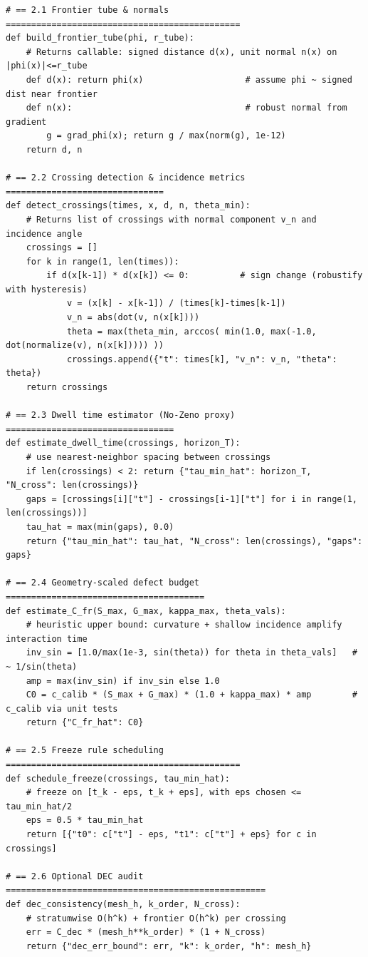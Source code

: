 \begin{lstlisting}
# == 2.1 Frontier tube & normals ==============================================
def build_frontier_tube(phi, r_tube):
    # Returns callable: signed distance d(x), unit normal n(x) on |phi(x)|<=r_tube
    def d(x): return phi(x)                    # assume phi ~ signed dist near frontier
    def n(x):                                  # robust normal from gradient
        g = grad_phi(x); return g / max(norm(g), 1e-12)
    return d, n

# == 2.2 Crossing detection & incidence metrics ===============================
def detect_crossings(times, x, d, n, theta_min):
    # Returns list of crossings with normal component v_n and incidence angle
    crossings = []
    for k in range(1, len(times)):
        if d(x[k-1]) * d(x[k]) <= 0:          # sign change (robustify with hysteresis)
            v = (x[k] - x[k-1]) / (times[k]-times[k-1])
            v_n = abs(dot(v, n(x[k])))
            theta = max(theta_min, arccos( min(1.0, max(-1.0, dot(normalize(v), n(x[k])))) ))
            crossings.append({"t": times[k], "v_n": v_n, "theta": theta})
    return crossings

# == 2.3 Dwell time estimator (No-Zeno proxy) =================================
def estimate_dwell_time(crossings, horizon_T):
    # use nearest-neighbor spacing between crossings
    if len(crossings) < 2: return {"tau_min_hat": horizon_T, "N_cross": len(crossings)}
    gaps = [crossings[i]["t"] - crossings[i-1]["t"] for i in range(1, len(crossings))]
    tau_hat = max(min(gaps), 0.0)
    return {"tau_min_hat": tau_hat, "N_cross": len(crossings), "gaps": gaps}

# == 2.4 Geometry-scaled defect budget =======================================
def estimate_C_fr(S_max, G_max, kappa_max, theta_vals):
    # heuristic upper bound: curvature + shallow incidence amplify interaction time
    inv_sin = [1.0/max(1e-3, sin(theta)) for theta in theta_vals]   # ~ 1/sin(theta)
    amp = max(inv_sin) if inv_sin else 1.0
    C0 = c_calib * (S_max + G_max) * (1.0 + kappa_max) * amp        # c_calib via unit tests
    return {"C_fr_hat": C0}

# == 2.5 Freeze rule scheduling ==============================================
def schedule_freeze(crossings, tau_min_hat):
    # freeze on [t_k - eps, t_k + eps], with eps chosen <= tau_min_hat/2
    eps = 0.5 * tau_min_hat
    return [{"t0": c["t"] - eps, "t1": c["t"] + eps} for c in crossings]

# == 2.6 Optional DEC audit ===================================================
def dec_consistency(mesh_h, k_order, N_cross):
    # stratumwise O(h^k) + frontier O(h^k) per crossing
    err = C_dec * (mesh_h**k_order) * (1 + N_cross)
    return {"dec_err_bound": err, "k": k_order, "h": mesh_h}


\end{lstlisting}
